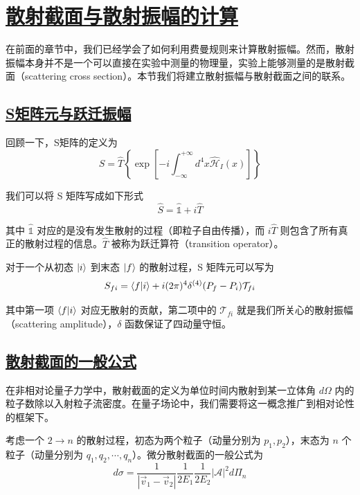 \section{\protect\hyperlink{:}{散射截面与散射振幅的计算}}

在前面的章节中，我们已经学会了如何利用费曼规则来计算散射振幅。然而，散射振幅本身并不是一个可以直接在实验中测量的物理量，实验上能够测量的是散射截面（scattering cross section）。本节我们将建立散射振幅与散射截面之间的联系。

\subsection{\protect\hyperlink{:}{S矩阵元与跃迁振幅}}

回顾一下，S矩阵的定义为
\begin{equation}
    \hat{S} = \hat{T}\left\{\exp\left[-i\int_{-\infty}^{+\infty}d^4x \hat{\mathcal{H}}_I(x)\right]\right\}
\end{equation}

我们可以将 S 矩阵写成如下形式
\begin{equation}
    \hat{S} = \hat{\mathbb{1}} + i\hat{T}
\end{equation}

其中 $\hat{\mathbb{1}}$ 对应的是没有发生散射的过程（即粒子自由传播），而 $i\hat{T}$ 则包含了所有真正的散射过程的信息。$\hat{T}$ 被称为跃迁算符（transition operator）。

对于一个从初态 $\ket{i}$ 到末态 $\ket{f}$ 的散射过程，S 矩阵元可以写为
\begin{equation}
    S_{fi} = \braket{f}{i} + i(2\pi)^4\delta^{(4)}(P_f - P_i)\mathcal{T}_{fi}
\end{equation}

其中第一项 $\braket{f}{i}$ 对应无散射的贡献，第二项中的 $\mathcal{T}_{fi}$ 就是我们所关心的散射振幅（scattering amplitude），$\delta$ 函数保证了四动量守恒。

\subsection{\protect\hyperlink{:}{散射截面的一般公式}}

在非相对论量子力学中，散射截面的定义为单位时间内散射到某一立体角 $d\Omega$ 内的粒子数除以入射粒子流密度。在量子场论中，我们需要将这一概念推广到相对论性的框架下。

考虑一个 $2 \to n$ 的散射过程，初态为两个粒子（动量分别为 $p_1, p_2$），末态为 $n$ 个粒子（动量分别为 $q_1, q_2, \cdots, q_n$）。微分散射截面的一般公式为
\begin{equation}
    d\sigma = \frac{1}{|\vec{v}_1 - \vec{v}_2|} \frac{1}{2E_1} \frac{1}{2E_2} |\mathcal{A}|^2 d\Pi_n
\end{equation}

